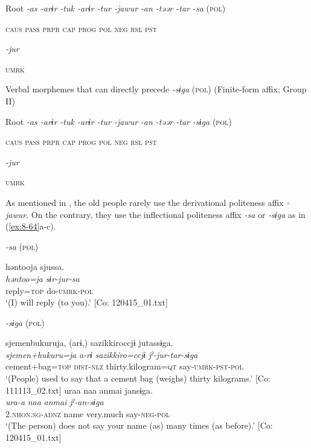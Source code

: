   Root  \textit{-as  -arɨr} %
\textit{-tuk  -arɨr  -tur  -jawur} %
\textit{-an  -təər  -tar  -sa} (\textsc{pol})

    \textsc{caus}  \textsc{pass}  \textsc{prpr}  \textsc{cap}  \textsc{prog}  \textsc{pol}  \textsc{neg}  \textsc{rsl}  \textsc{pst}

          \textit{-jur}

          \textsc{umrk}


\ex Verbal morphemes that can directly precede \textit{-sɨga} (\textsc{pol}) (Finite-form affix; Group II)

  Root  \textit{-as  -arɨr} %
\textit{-tuk  -arɨr  -tur  -jawur} %
\textit{-an  -təər  -tar  -sɨga} (\textsc{pol})

    \textsc{caus}  \textsc{pass}  \textsc{prpr}  \textsc{cap}  \textsc{prog}  \textsc{pol}  \textsc{neg}  \textsc{rsl}  \textsc{pst}

          \textit{-jur}

          \textsc{umrk}
\z
\z

As mentioned in , the old people rarely use the derivational politeness affix \textit{-jawur}. On the contrary, they use the inflectional politeness affix \textit{-sa} or \textit{-sɨga} as in (\ref{ex:8-64}a-c).

\ea\label{ex:8-64}
  \textit{-sa} (\textsc{pol})


{\TM}
\glll  həntooja  sjussa.\\
\textit{həntoo=ja}  \textit{sɨr-jur-sa}\\
reply=\textsc{top}  do-\textsc{umrk}-\textsc{pol}\\
\glt ‘(I) will reply (to you).’ [Co: 120415\_01.txt]

  \textit{-sɨga} (\textsc{pol})

\ex
{\TM}
\glll  sjemenbukuruja,  (arɨ,)  sazikkiroccjɨ  jutassɨga.\\
\textit{sjemen+hukuru=ja}  \textit{a-rɨ}  \textit{sazikkiro=ccjɨ}  \textit{jˀ-jur-tar-sɨga}\\
cement+bag=\textsc{top}  \textsc{dist}-\textsc{nlz}  thirty.kilogram=\textsc{qt}  say-\textsc{umrk}-\textsc{pst}-\textsc{pol}\\
\glt ‘(People) used to say that a cement bag (weighs) thirty kilograms.’ [Co: 111113\_02.txt]
\ex
{\TM}
\glll  uraa  naa  anmai  jansɨga.\\
\textit{ura-a}  \textit{naa}  \textit{anmai}  \textit{jˀ-an-sɨga}\\
2.\textsc{nhon}.\textsc{sg}-\textsc{adnz}  name  very.much  say-\textsc{neg}-\textsc{pol}\\
\glt ‘(The person) does not say your name (as) many times (as before).’ [Co: 120415\_01.txt]
\z
\z

